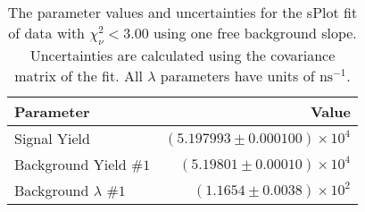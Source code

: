
\begin{table}[h]
    \begin{center}
        \begin{tabular}{lr}\toprule
            Parameter & Value \\\midrule
            Signal Yield & $(5.197993 \pm 0.000100) \times 10^{4}$ \\
            Background Yield $\#1$ & $(5.19801 \pm 0.00010) \times 10^{4}$ \\
            Background $\lambda$ $\#1$ & $(1.1654 \pm 0.0038) \times 10^{2}$ \\\bottomrule
        \end{tabular}
        \caption{The parameter values and uncertainties for the sPlot fit of data with $\chi^2_\nu < 3.00$ using one free background slope. Uncertainties are calculated using the covariance matrix of the fit. All $\lambda$ parameters have units of $\si{\nano\second}^{-1}$.}
    \end{center}
\end{table}
